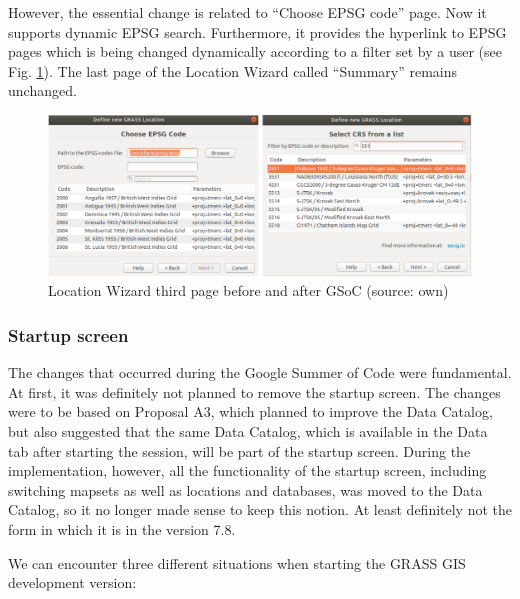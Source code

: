 \documentclass[a4paper,10pt,twoside]{article}
\begin{document}
\newpage
However, the essential change is related to ``Choose EPSG code'' page. Now it supports dynamic EPSG search. Furthermore, it provides the hyperlink to EPSG pages which is being changed dynamically according to a filter set by a user (see Fig. \ref{fig:loc_wiz_3}). The last page of the Location Wizard called ``Summary'' remains unchanged.


\vspace{0.3cm}
\begin{figure}[hbt!] 
\begin{center}
\includegraphics[width=17cm]{../pictures/loc_wiz_3.png} 
\caption[Location Wizard third page before and after GSoC)]{Location Wizard third page before and after GSoC (source: own)}
\label{fig:loc_wiz_3}
\end{center}
\end{figure}

\vspace*{-1cm}
\subsubsection{Startup screen}

The changes that occurred during the Google Summer of Code were fundamental. At first, it was definitely not planned to remove the startup screen. The changes were to be based on Proposal A3, which planned to improve the Data Catalog, but also suggested that the same Data Catalog, which is available in the Data tab after starting the session, will be part of the startup screen.
During the implementation, however, all the functionality of the startup screen, including switching mapsets as well as locations and databases, was moved to the Data Catalog, so it no longer made sense to keep this notion. At least definitely not the form in which it is in the version 7.8.

\noindent We can encounter three different situations when starting the GRASS GIS development version:
\end{document}
